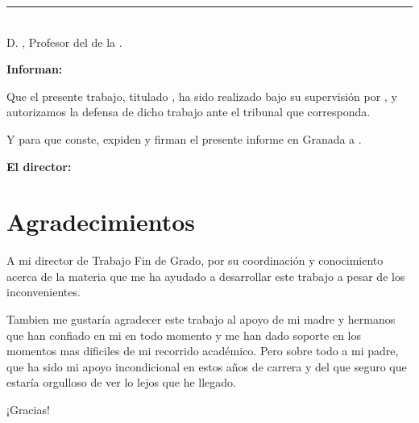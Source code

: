 \noindent\rule[-1ex]{\textwidth}{2pt}\\[4.5ex]

D. \textbf{\myProf}, Profesor del \myDepartment de la \myUni.

\vspace{0.5cm}

\textbf{Informan:}

\vspace{0.5cm}

Que el presente trabajo, titulado \textit{\textbf{\myTitle}}, ha sido realizado bajo su supervisión por \textbf{\myName}, y autorizamos la defensa de dicho trabajo ante el tribunal
que corresponda.

\vspace{0.5cm}

Y para que conste, expiden y firman el presente informe en Granada a \myTime.

\vspace{1cm}

\textbf{El director:}

\vspace{5cm}

\noindent \textbf{\myProf}


\chapter*{Agradecimientos}

\thispagestyle{empty}

\vspace{1cm}

A mi director de Trabajo Fin de Grado, \myProf  por su coordinación y conocimiento acerca de la materia que me ha ayudado a desarrollar este trabajo a pesar de los inconvenientes.

Tambien me gustaría agradecer este trabajo al apoyo de mi madre y hermanos que han confiado en mi en todo momento y me han dado soporte en los momentos mas dificiles de
mi recorrido académico. Pero sobre todo a mi padre, que ha sido mi apoyo incondicional en estos años de carrera y del que seguro que estaría orgulloso de ver lo lejos que he llegado.

¡Gracias!
